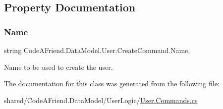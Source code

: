 \subsection{Property Documentation}
\mbox{\label{class_code_a_friend_1_1_data_model_1_1_user_1_1_create_command_a6f79ef49bd792a9d15ae1c74298bf11c}} 
\subsubsection{\texorpdfstring{Name}{Name}}
{\footnotesize\ttfamily string Code\+A\+Friend.\+Data\+Model.\+User.\+Create\+Command.\+Name\hspace{0.3cm}{\ttfamily [get]}, {\ttfamily [set]}}



Name to be used to create the user.



The documentation for this class was generated from the following file\+:\begin{DoxyCompactItemize}
\item 
shared/\+Code\+A\+Friend.\+Data\+Model/\+User\+Logic/\mbox{\hyperlink{_user_8_commands_8cs}{User.\+Commands.\+cs}}\end{DoxyCompactItemize}
